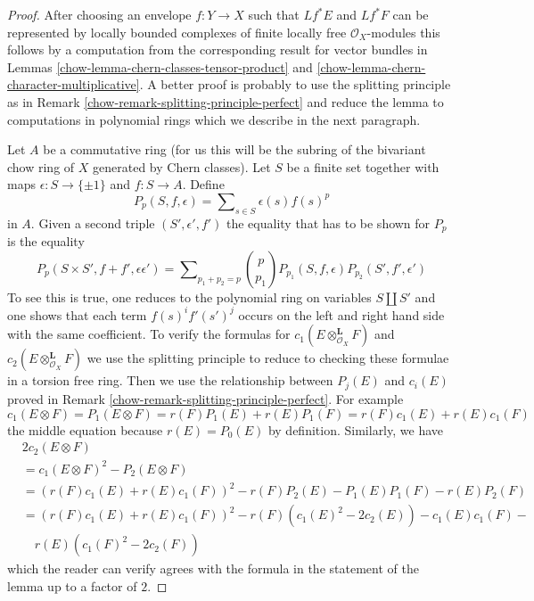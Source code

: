 \begin{proof}

After choosing an envelope $f : Y \to X$ such that $Lf^*E$ and $Lf^*F$
can be represented by locally bounded complexes of finite locally
free $\mathcal{O}_X$-modules this follows by a computation from the
corresponding result for vector bundles in
Lemmas \ref{chow-lemma-chern-classes-tensor-product} and
\ref{chow-lemma-chern-character-multiplicative}.
A better proof is probably to use the splitting principle as in
Remark \ref{chow-remark-splitting-principle-perfect}
and reduce the lemma to computations in polynomial rings
which we describe in the next paragraph.

\medskip\noindent
Let $A$ be a commutative ring (for us this will be the subring of the
bivariant chow ring of $X$ generated by Chern classes).
Let $S$ be a finite set together with maps $\epsilon : S \to \{\pm 1\}$
and $f : S \to A$. Define
$$
P_p(S, f , \epsilon) = \sum\nolimits_{s \in S} \epsilon(s) f(s)^p
$$
in $A$. Given a second triple $(S', \epsilon', f')$
the equality that has to be shown for $P_p$ is the equality
$$
P_p(S \times S', f + f' , \epsilon \epsilon') =
\sum\nolimits_{p_1 + p_2 = p}
{p \choose p_1} P_{p_1}(S, f, \epsilon) P_{p_2}(S', f', \epsilon')
$$
To see this is true, one reduces to the polynomial ring on variables
$S \amalg S'$ and one shows that each term $f(s)^if'(s')^j$ occurs
on the left and right hand side with the same coefficient.
To verify the formulas for $c_1(E \otimes_{\mathcal{O}_X}^\mathbf{L} F)$
and $c_2(E \otimes_{\mathcal{O}_X}^\mathbf{L} F)$ we use the splitting
principle to reduce to checking these formulae in a torsion free ring.
Then we use the relationship between $P_j(E)$ and $c_i(E)$ proved
in Remark \ref{chow-remark-splitting-principle-perfect}. For example
$$
c_1(E \otimes F) = P_1(E \otimes F) = r(F)P_1(E) + r(E)P_1(F) =
r(F)c_1(E) + r(E)c_1(F)
$$
the middle equation because $r(E) = P_0(E)$ by definition. Similarly, we have
\begin{align*}
& 2c_2(E \otimes F) \\
& = c_1(E \otimes F)^2 - P_2(E \otimes F) \\
& =
(r(F)c_1(E) + r(E)c_1(F))^2 -
r(F)P_2(E) - P_1(E)P_1(F) - r(E)P_2(F) \\
& =
(r(F)c_1(E) + r(E)c_1(F))^2 -
r(F)(c_1(E)^2 - 2c_2(E)) - c_1(E)c_1(F) - \\
& \quad r(E)(c_1(F)^2 - 2c_2(F))
\end{align*}
which the reader can verify agrees with the formula in the statement
of the lemma up to a factor of $2$.
\end{proof}

